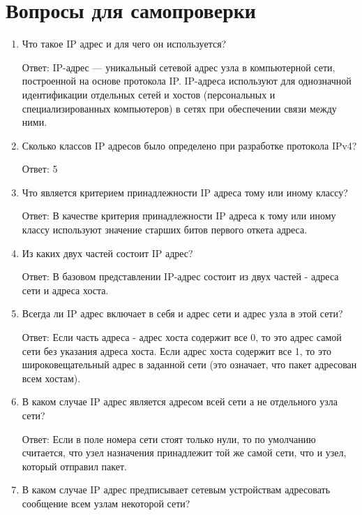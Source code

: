 \documentclass[bachelor, och, labwork]{shiza}
\begin{document}
\section{Вопросы для самопроверки}
    \begin{enumerate}
        \item Что такое IP адрес и для чего он используется?
        
        Ответ: IP-адрес — уникальный сетевой адрес узла в компьютерной сети, построенной на основе протокола IP. IP-адреса используют для однозначной
        идентификации отдельных сетей и хостов (персональных и специализированных компьютеров) в сетях при обеспечении связи между ними.

        \item Сколько классов IP адресов было определено при разработке протокола IPv4?
        
        Ответ: 5

        \item Что является критерием принадлежности IP адреса тому или иному классу?
        
        Ответ: В качестве критерия принадлежности IP адреса к тому или иному классу используют значение старших битов первого откета адреса.

        \item Из каких двух частей состоит IP адрес?

        Ответ: В базовом представлении IP-адрес состоит из двух частей - адреса сети и адреса хоста.
        
        \item Всегда ли IP адрес включает в себя и адрес сети и адрес узла в этой сети?
        
        Ответ: Если часть адреса - адрес хоста содержит все 0, то это адрес самой сети без указания адреса хоста. Если адрес хоста содержит все 1, 
        то это широковещательный адрес в заданной сети (это означает, что пакет адресован всем хостам).

        \item В каком случае IP адрес является адресом всей сети а не отдельного узла сети?
        
        Ответ: Если в поле номера сети стоят только нули, то по умолчанию считается, что узел назначения принадлежит той же самой сети, что и узел, который
        отправил пакет.

        \item В каком случае IP адрес предписывает сетевым устройствам адресовать сообщение всем узлам некоторой сети?
        

\end{enumerate}
\end{document}
